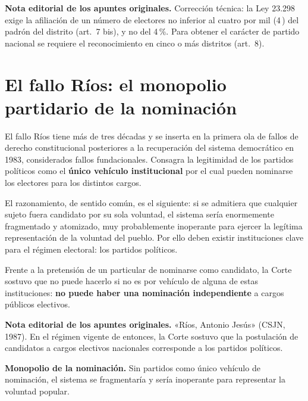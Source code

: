 \documentclass[12pt,oneside]{book}
\begin{document}
\begin{note}
\textbf{Nota editorial de los apuntes originales.} Corrección técnica: la Ley 23.298 exige la afiliación de un número de electores no inferior al cuatro por mil (4\,\textperthousand) del padrón del distrito (art.~7 bis), y no del 4\,\%. Para obtener el carácter de partido nacional se requiere el reconocimiento en cinco o más distritos (art.~8).
\end{note}

\section{El fallo Ríos: el monopolio partidario de la nominación}

El fallo Ríos tiene más de tres décadas y se inserta en la primera ola de fallos de derecho constitucional posteriores a la recuperación del sistema democrático en 1983, considerados fallos fundacionales. Consagra la legitimidad de los partidos políticos como el \textbf{único vehículo institucional} por el cual pueden nominarse los electores para los distintos cargos.

El razonamiento, de sentido común, es el siguiente: si se admitiera que cualquier sujeto fuera candidato por su sola voluntad, el sistema sería enormemente fragmentado y atomizado, muy probablemente inoperante para ejercer la legítima representación de la voluntad del pueblo. Por ello deben existir instituciones clave para el régimen electoral: los partidos políticos.

Frente a la pretensión de un particular de nominarse como candidato, la Corte sostuvo que no puede hacerlo si no es por vehículo de alguna de estas instituciones: \textbf{no puede haber una nominación independiente} a cargos públicos electivos.

\begin{note}
\textbf{Nota editorial de los apuntes originales.} «Ríos, Antonio Jesús» (CSJN, 1987). En el régimen vigente de entonces, la Corte sostuvo que la postulación de candidatos a cargos electivos nacionales corresponde a los partidos políticos.
\end{note}

\begin{important}
\textbf{Monopolio de la nominación.} Sin partidos como único vehículo de nominación, el sistema se fragmentaría y sería inoperante para representar la voluntad popular.
\end{important}
\end{document}
